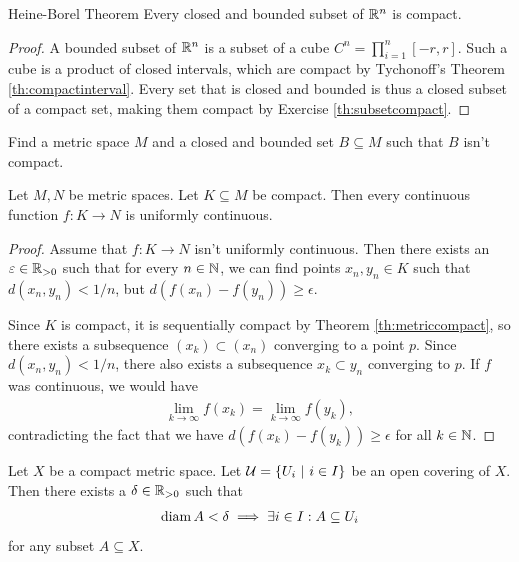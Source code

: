 \begin{importanttheorem}{Heine-Borel Theorem}{}
	Every closed and bounded subset of $\mathbb{R}^n$ is compact.
\end{importanttheorem}
\begin{proof}
	A bounded subset of $\mathbb{R}^n$ is a subset of a cube $C^n = \prod_{i = 1}^n [-r,r]$. Such a cube is a product of closed intervals, which are compact by Tychonoff's Theorem \ref{th:compactinterval}. Every set that is closed and bounded is thus a closed subset of a compact set, making them compact by Exercise \ref{th:subsetcompact}.
\end{proof}
\begin{exercise}
	Find a metric space $M$ and a closed and bounded set $B \subseteq M$ such that $B$ isn't compact.
\end{exercise}
\begin{theorem}
	\label{th:compactuniformcontinuity}
	Let $M,N$ be metric spaces. Let $K \subseteq M$ be compact.
	Then every continuous function $f : K \to N$ is uniformly continuous.
\end{theorem}
\begin{proof}
	Assume that $f : K \to N$ isn't uniformly continuous. Then there exists an $\varepsilon \in \mathbb{R}_{> 0}$ such that for every $n \in \mathbb{N}$, we can find points $x_n, y_n \in K$ such that $d(x_n, y_n) < 1/n$, but $d(f(x_n) - f(y_n)) \geq \epsilon$.
	
	Since $K$ is compact, it is sequentially compact by Theorem \ref{th:metriccompact}, so there exists a subsequence $(x_k) \subset (x_n)$ converging to a point $p$. Since $d(x_n, y_n) < 1/n$, there also exists a subsequence $x_k \subset y_n$ converging to $p$. If $f$ was continuous, we would have
	\begin{align*}
		\lim_{k \to \infty} f(x_k) = \lim_{k \to \infty} f(y_k),
	\end{align*}
	contradicting the fact that we have $d(f(x_k) - f(y_k)) \geq \epsilon$ for all $k \in \mathbb{N}$.
\end{proof}
\begin{lemma}
	 Let $X$ be a compact metric space. Let $\mathcal{U} = \qty{U_i ~\middle|~i \in I}$ be an open covering of $X$. Then there exists a  $\delta \in \mathbb{R}_{> 0}$ such that
	\begin{align*}
		\operatorname{diam} A < \delta \implies \exists i \in I : A \subseteq U_i
	\end{align*}
	for any subset $A \subseteq X$.
\end{lemma}

